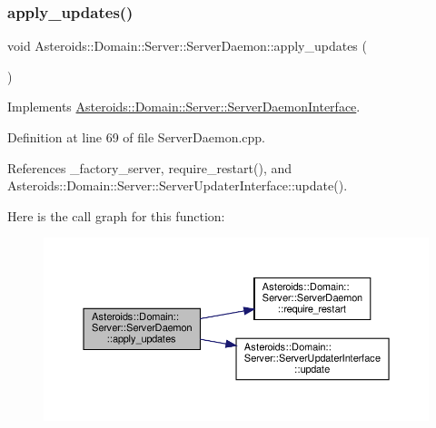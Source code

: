 \subsubsection{\texorpdfstring{apply\+\_\+updates()}{apply\_updates()}}
{\footnotesize\ttfamily void Asteroids\+::\+Domain\+::\+Server\+::\+Server\+Daemon\+::apply\+\_\+updates (\begin{DoxyParamCaption}{ }\end{DoxyParamCaption})\hspace{0.3cm}{\ttfamily [virtual]}}



Implements \hyperlink{classAsteroids_1_1Domain_1_1Server_1_1ServerDaemonInterface_a3ee79b1b6b1e88db05d015969c9fcdc7}{Asteroids\+::\+Domain\+::\+Server\+::\+Server\+Daemon\+Interface}.



Definition at line 69 of file Server\+Daemon.\+cpp.



References \+\_\+factory\+\_\+server, require\+\_\+restart(), and Asteroids\+::\+Domain\+::\+Server\+::\+Server\+Updater\+Interface\+::update().

Here is the call graph for this function\+:\nopagebreak
\begin{figure}[H]
\begin{center}
\leavevmode
\includegraphics[width=350pt]{classAsteroids_1_1Domain_1_1Server_1_1ServerDaemon_ad5e5e845e150a331cdb6703d8b8ba94f_cgraph}
\end{center}
\end{figure}
\mbox{\label{classAsteroids_1_1Domain_1_1Server_1_1ServerDaemon_a16123054c6978205c98ffeb122894606}} 
